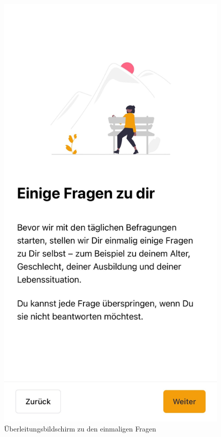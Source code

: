\begin{figure}[h]
    \centering
    \begin{minipage}[t]{0.38\textwidth}
        \centering
        \includegraphics[width=\textwidth]{Arbeit/images/printscreens/fragen_zu_dir.jpeg}
        \caption{Überleitungsbildschirm zu den einmaligen Fragen}

\end{minipage}
\end{figure}
